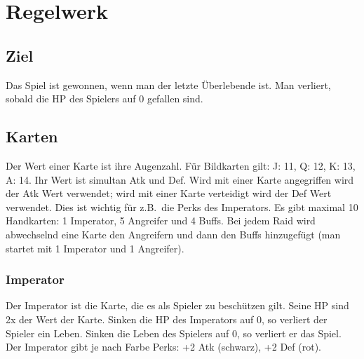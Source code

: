 \documentclass[a4paper,12pt]{article}
\numberwithin{equation}{section}
\begin{document}

\title{}
\author{}
\maketitle
{}


\newpage


\fancyhead[L]{\thepage}
\fancyfoot[C]{}

\tableofcontents


\newpage


\fancyhead[R]{\leftmark\\\rightmark}

\section{Regelwerk}
\subsection{Ziel}
Das Spiel ist gewonnen, wenn man der letzte Überlebende ist.
Man verliert, sobald die HP des Spielers auf 0 gefallen sind.

\subsection{Karten}
Der Wert einer Karte ist ihre Augenzahl.
Für Bildkarten gilt: J: 11, Q: 12, K: 13, A: 14.
Ihr Wert ist simultan Atk und Def.
Wird mit einer Karte angegriffen wird der Atk Wert verwendet; wird mit einer Karte verteidigt wird der Def Wert verwendet.
Dies ist wichtig für z.B.\ die Perks des Imperators.
Es gibt maximal 10 Handkarten: 1 Imperator, 5 Angreifer und 4 Buffs.
Bei jedem Raid wird abwechselnd eine Karte den Angreifern und dann den Buffs hinzugefügt (man startet mit 1 Imperator und 1 Angreifer).

\subsubsection{Imperator}
Der Imperator ist die Karte, die es als Spieler zu beschützen gilt.
Seine HP sind 2x der Wert der Karte.
Sinken die HP des Imperators auf 0, so verliert der Spieler ein Leben.
Sinken die Leben des Spielers auf 0, so verliert er das Spiel.
Der Imperator gibt je nach Farbe Perks: +2 Atk (schwarz), +2 Def (rot).
\end{document}
